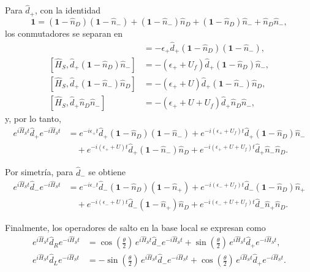 \begin{appendixs}
Para $\hat{d}_{+}$, con la identidad
\[
\mathbf{1} = (\mathbf{1}-\hat{n}_{D})(\mathbf{1}-\hat{n}_{-}) + (\mathbf{1}-\hat{n}_{-})\hat{n}_{D} + (\mathbf{1}-\hat{n}_{D})\hat{n}_{-} + \hat{n}_{D}\hat{n}_{-},
\]
los conmutadores se separan en
\begin{align*}
    [\hat{H}_{S},\hat{d}_{+}(\mathbf{1}-\hat{n}_{D})(\mathbf{1} - \hat{n}_{-})] & = - \epsilon_{+}\hat{d}_{+}(\mathbf{1}-\hat{n}_{D})(\mathbf{1} - \hat{n}_{-}), \\
    [\hat{H}_{S},\hat{d}_{+}(\mathbf{1}-\hat{n}_{D})\hat{n}_{-}] & = - (\epsilon_{+} + U_{f})\hat{d}_{+}(\mathbf{1}-\hat{n}_{D})\hat{n}_{-}, \\
    [\hat{H}_{S},\hat{d}_{+}(\mathbf{1}-\hat{n}_{-})\hat{n}_{D}] & = - (\epsilon_{+} + U)\hat{d}_{+}(\mathbf{1} - \hat{n}_{-})\hat{n}_{D}, \\
    [\hat{H}_{S},\hat{d}_{+}\hat{n}_{D}\hat{n}_{-}] & = - (\epsilon_{+} + U + U_{f})\hat{d}_{+}\hat{n}_{D}\hat{n}_{-},
\end{align*}
y, por lo tanto,
\begin{align*}
    e^{i \hat{H}_{S}t}\hat{d}_{+}e^{-i\hat{H}_{S}t} & =
    e^{-i\epsilon_{+}t}\hat{d}_{+}(\mathbf{1}-\hat{n}_{D})(\mathbf{1}-\hat{n}_{-})
    + e^{-i(\epsilon_{+}+U_{f})t} \hat{d}_{+}(\mathbf{1}-\hat{n}_{D})\hat{n}_{-} \\
    & \quad + e^{-i(\epsilon_{+}+U)t}\hat{d}_{+}(\mathbf{1}-\hat{n}_{-})\hat{n}_{D}
    + e^{-i(\epsilon_{+}+U+U_{f})t}\hat{d}_{+}\hat{n}_{-}\hat{n}_{D}.
\end{align*}

Por simetría, para $\hat{d}_{-}$ se obtiene
\begin{align*}
    e^{i \hat{H}_{S}t}\hat{d}_{-}e^{-i\hat{H}_{S}t} & =
    e^{-i\epsilon_{-}t}\hat{d}_{-}(\mathbf{1}-\hat{n}_{D})(\mathbf{1}-\hat{n}_{+})
    + e^{-i(\epsilon_{-}+U_{f})t} \hat{d}_{-}(\mathbf{1}-\hat{n}_{D})\hat{n}_{+} \\
    & \quad + e^{-i(\epsilon_{-}+U)t}\hat{d}_{-}(\mathbf{1}-\hat{n}_{+})\hat{n}_{D}
    + e^{-i(\epsilon_{-}+U+U_{f})t}\hat{d}_{-}\hat{n}_{+}\hat{n}_{D}.
\end{align*}

Finalmente, los operadores de salto en la base local se expresan como
\begin{align*}
    e^{i\hat{H}_{S}t}\hat{d}_{R}e^{-i\hat{H}_{S}t} & =
    \cos(\tfrac{\theta}{2})\, e^{i\hat{H}_{S}t}\hat{d}_{-}e^{-i\hat{H}_{S}t}
    + \sin(\tfrac{\theta}{2})\, e^{i\hat{H}_{S}t}\hat{d}_{+}e^{-i\hat{H}_{S}t}, \\
    e^{i\hat{H}_{S}t}\hat{d}_{L}e^{-i\hat{H}_{S}t} & =
    -\sin(\tfrac{\theta}{2})\, e^{i\hat{H}_{S}t}\hat{d}_{-}e^{-i\hat{H}_{S}t}
    + \cos(\tfrac{\theta}{2})\, e^{i\hat{H}_{S}t}\hat{d}_{+}e^{-i\hat{H}_{S}t}.
\end{align*}


\end{appendixs}
